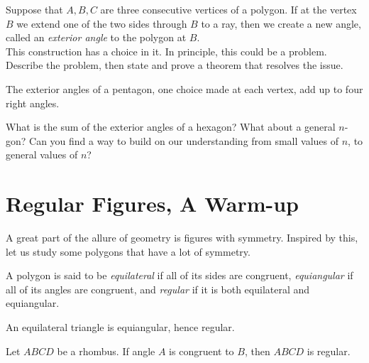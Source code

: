 \begin{problem}\label{prob:exterior-angle}
Suppose that $A,B,C$ are three consecutive vertices of a polygon. 
If at the vertex $B$ we extend one of the two sides through $B$ to a ray, then we create a new angle, called an \emph{exterior angle} to the polygon at $B$.\\
This construction has a choice in it. 
In principle, this could be a problem. 
Describe the problem, then state and prove a theorem that resolves the issue.
\end{problem}




\begin{conjecture}\label{conj:ext-angles-pentagon}
The exterior angles of a pentagon, one choice made at each vertex, add up to four right angles.
\end{conjecture}


\begin{question}\label{question-induction}
What is the sum of the exterior angles of a hexagon? 
What about a general $n$-gon? 
Can you find a way to build on our understanding from small values of $n$, to general values of $n$?
\end{question}



\chapter{Regular Figures, A Warm-up}

A great part of the allure of geometry is figures with symmetry. Inspired by this, let us study some polygons that have a lot of symmetry.

\begin{definition}\label{defn:regular}
A polygon is said to be \emph{equilateral} if all of its sides are congruent, \emph{equiangular} if all of its angles are congruent, and \emph{regular} if it is both equilateral and equiangular.
\end{definition}

\begin{conjecture}\label{conj:equilateral-triangle}
An equilateral triangle is equiangular, hence regular.
\end{conjecture}

\begin{conjecture}\label{conj:regular-rhombus}
Let $ABCD$ be a rhombus. If angle $A$ is congruent to $B$, then $ABCD$ is regular.
\end{conjecture}

